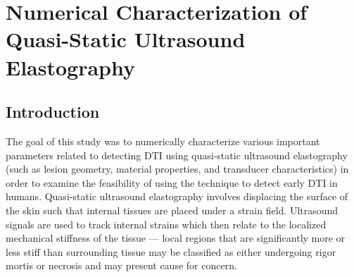\chapter{Numerical Characterization of Quasi-Static Ultrasound Elastography}
	\section{Introduction}
		The goal of this study was to numerically characterize various important parameters related to detecting DTI using quasi-static ultrasound elastography (such as lesion geometry, material properties, and transducer characteristics) in order to examine the feasibility of using the technique to detect early DTI in humans. Quasi-static ultrasound elastography involves displacing the surface of the skin such that internal tissues are placed under a strain field. Ultrasound signals are used to track internal strains which then relate to the localized mechanical stiffness of the tissue --- local regions that are significantly more or less stiff than surrounding tissue may be classified as either undergoing rigor mortis or necrosis and may present cause for concern.
		
